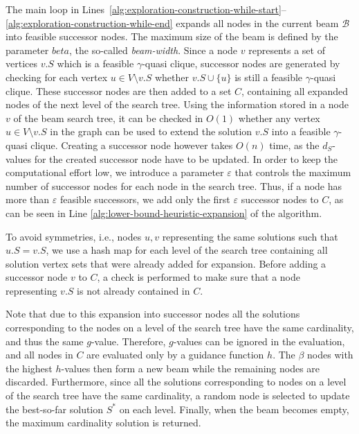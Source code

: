 \documentclass[draft,final]{vutinfth} %
\begin{document}
The main loop in Lines~\ref{alg:exploration-construction-while-start}--\ref{alg:exploration-construction-while-end} expands all nodes in the current beam $\mathcal{B}$ into feasible successor nodes. The maximum size of the beam is defined by the parameter $beta$, the so-called \emph{beam-width}. 
Since a node $v$ represents a set of vertices $v.S$ which is a feasible $\gamma$-quasi clique, successor nodes are generated by checking for each vertex $u \in V \setminus v.S$ whether $v.S \cup \{u\}$ is still a feasible $\gamma$-quasi clique. These successor nodes are then added to a set $C$, containing all expanded nodes of the next level of the search tree. 
Using the information stored in a node $v$ of the beam search tree, it can be checked in $O(1)$ whether any vertex $u \in V \setminus v.S$ in the graph can be used to extend the solution $v.S$ into a feasible $\gamma$-quasi clique. Creating a successor node however takes $O(n)$ time, as the $d_S$-values for the created successor node have to be updated. 
In order to keep the computational effort low, we introduce a parameter $\varepsilon$ that controls the maximum number of successor nodes for each node in the search tree. Thus, if a node has more than $\varepsilon$ feasible successors, we add only the first $\varepsilon$ successor nodes to $C$, as can be seen in Line \ref{alg:lower-bound-heuristic-expansion} of the algorithm. 

To avoid symmetries, i.e., nodes $u,v$ representing the same solutions such that $u.S = v.S$, we use a hash map for each level of the search tree containing all solution vertex sets that were already added for expansion. Before adding a successor node $v$ to $C$, a check is performed to make sure that a node representing $v.S$ is not already contained in $C$. 
 
Note that due to this expansion into successor nodes all the solutions corresponding to the nodes on a level of the search tree have the same cardinality, and thus the same $g$-value. 
Therefore, $g$-values can be ignored in the evaluation, and all nodes in $C$ are evaluated only by a guidance function $h$. The $\beta$ nodes with the highest $h$-values then form a new beam while the remaining nodes are discarded. 
Furthermore, since all the solutions corresponding to nodes on a level of the search tree have the same cardinality, a random node is selected to update the best-so-far solution $S^*$ on each level.
Finally, when the beam becomes empty, the maximum cardinality solution is returned. 
\end{document}
